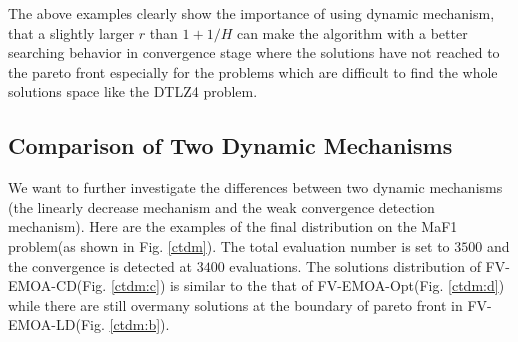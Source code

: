 \documentclass[conference]{IEEEtran}
\begin{document}
The above examples clearly show the importance of using dynamic mechanism, 
that a slightly larger $r$ than $1+1/H$ can make the algorithm with a better searching behavior in 
convergence stage where the solutions have not reached to the pareto front 
especially for the problems which are difficult to find the whole solutions space like the DTLZ4 problem. 

%
\subsection{Comparison of Two Dynamic Mechanisms}
We want to further investigate the differences between two dynamic mechanisms 
(the linearly decrease mechanism and the weak convergence detection mechanism). 
Here are the examples of the final distribution on the MaF1 problem(as shown in Fig. \ref{ctdm}).
The total evaluation number is set to $3500$ and the convergence is detected at $3400$ evaluations. 
The solutions distribution of FV-EMOA-CD(Fig. \ref{ctdm:c}) is similar to 
the that of FV-EMOA-Opt(Fig. \ref{ctdm:d})
while there are still overmany solutions at the boundary of pareto front in FV-EMOA-LD(Fig. \ref{ctdm:b}). 
\end{document}
